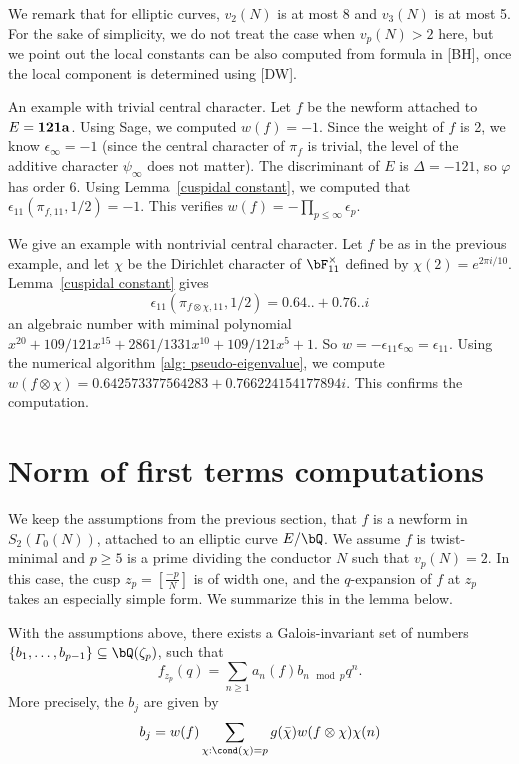 \documentclass [11pt, proquest] {uwthesis}[2015/03/03]
\begin{document}
We remark that for elliptic curves, $v_2(N)$ is at most 8 and $v_3(N)$ is at most 5. For the sake of simplicity, we do not treat the case when $v_p(N) > 2$ here, but we point out the local constants can be  also computed from formula in [BH], 
once the local component is determined using [DW]. 

\begin{Example}
An example with trivial central character.  Let $f$ be the newform attached to $E = \bf{121a}$. Using Sage, we computed $w(f) = -1$. Since the weight of $f$ is 2, we know $\epsilon_\infty = -1$ (since the central character of $\pi_f$ is trivial, the level of the additive character $\psi_\infty$ does not matter). The discriminant of $E$ is $\Delta = -121$, so $\varphi$ has order 6. Using Lemma~\ref{cuspidal constant}, we computed that
$\epsilon_{11}(\pi_{f,11}, 1/2) = -1$. This verifies $w(f) = - \prod_{p \leq \infty} \epsilon_p$. 
\end{Example}

\begin{Example}
We give an example with nontrivial central character. Let $f$ be as in the previous example, and let $\chi$ be the Dirichlet character of $\bF_{11}^{\times}$ defined by $\chi(2) = e^{2\pi i /10}$. Lemma~\ref{cuspidal constant} gives 
\[
	\epsilon_{11}(\pi_{f \otimes \chi,11}, 1/2) = 0.64..+0.76..i
\]
an algebraic number with miminal polynomial $x^{20} + 109/121 x^15 + 2861/1331 x^10 + 109/121x^5 + 1$.
So $w = - \epsilon_{11} \epsilon_\infty = \epsilon_{11}$. Using the numerical algorithm \ref{alg: pseudo-eigenvalue},
we compute $w(f \otimes \chi) = 0.642573377564283 + 0.766224154177894i$. This confirms the computation. 
\end{Example}


\section{Norm of first terms computations}

We keep the assumptions from the previous section, that $f$ is a newform in $S_2(\Gamma_0(N))$, attached to an elliptic curve $E/\bQ$. We assume $f$ is twist-minimal and $p \geq 5$ is a prime dividing the conductor $N$ such that 
$v_p(N) = 2$.  In this case, the cusp $z_p = \left[\frac{-p}{N} \right]$ is of width one, and the $q$-expansion of $f$ at $z_p$
takes an especially simple form.  We summarize this in the lemma below. 
\begin{Lemma}
With the assumptions above, there exists a Galois-invariant set of numbers $\{b_1, \ldots, b_{p-1}\} \subseteq \bQ(\zeta_p)$, such that 
\[
	f_{z_p}(q) = \sum_{n \geq 1} a_n(f) b_{n\mod{p}} q^n. 
\]
More precisely, the $b_j$ are given by 
\[
 b_j = w(f) \sum_{\chi: \cond(\chi) = p} g(\bar{\chi}) w(f\otimes \chi) \chi(n)
\]
\end{Lemma}
\end{document}
